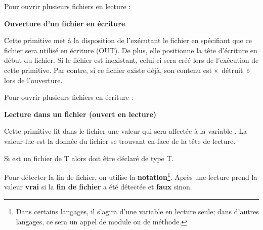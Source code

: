 Pour ouvrir plusieurs fichiers en lecture :


{\sffamily\bfseries\upshape
Ouverture d’un fichier en écriture }


Cette primitive met à la disposition de l’exécutant le fichier
 en spécifiant que ce fichier sera
utilisé en écriture (OUT). De plus, elle positionne la tête d’écriture
en début du fichier. Si le fichier  est
inexistant, celui-ci sera créé lors de l’exécution de cette primitive.
Par contre, si ce fichier existe déjà, son contenu est «~détruit~» lors
de l'ouverture.

Pour ouvrir plusieurs fichiers en écriture :


{\sffamily\bfseries\upshape
Lecture dans un fichier (ouvert en lecture) }


Cette primitive lit dans le fichier  une
valeur qui sera affectée à la variable .
La valeur lue est la donnée du fichier se trouvant en face de la tête
de lecture. 

Si  est un fichier de T alors
 doit être déclaré de type T.

Pour détecter la fin de fichier, on utilise la
\textbf{notation}\footnote{Dans certains langages, il
s'agira d'une variable en lecture
seule; dans d'autres langages, ce sera un appel de
module ou de méthode.}.
Après une lecture  prend la valeur
\textbf{vrai} si la \textbf{fin de fichier} a été détectée et
\textbf{faux} sinon.

